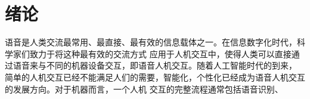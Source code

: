 \chapter{绪论}
语音是人类交流最常用、最直接、最有效的信息载体之一。在信息数字化时代，科学家们致力于将这种最有效的交流方式
应用于人机交互中，使得人类可以直接通过语音来与不同的机器设备交互，即语音人机交互。随着人工智能时代的到来，
简单的人机交互已经不能满足人们的需要，智能化，个性化已经成为语音人机交互的发展方向。对于机器而言，一个人机
交互的完整流程通常包括语音识别、

